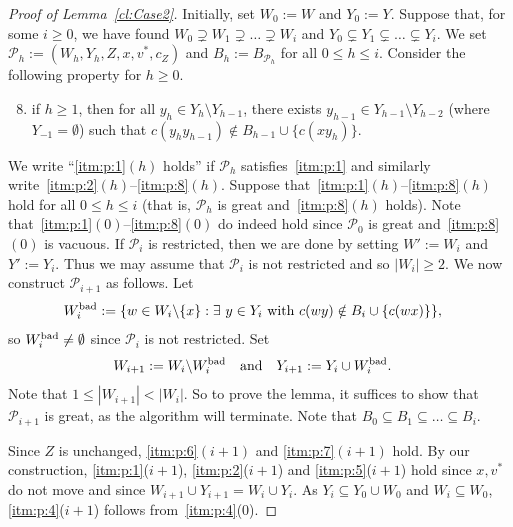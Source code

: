 \documentclass[a4paper, 12pt]{article}
\numberwithin{equation}{section}
\def\sm{{\setminus}}
\newcommand{\mc}[1]{\mathcal{#1}}
\begin{document}
\begin{proof}[Proof of Lemma~\ref{cl:Case2}]
Initially, set $W_0 := W$ and $Y_0 := Y$.
Suppose that, for some $i \ge 0$, we have found
$W_0 \supsetneq W_1 \supsetneq \dots \supsetneq W_i$ and $Y_0 \subsetneq Y_1 \subsetneq \dots \subsetneq Y_i$.
We set $\mc{P}_h := (W_h, Y_h,Z, x, v^*, c_Z)$ and $B_h := B_{\mc{P}_h}$ for all $0 \leq h \leq i$.
Consider the following property for $h \geq 0$.

\medskip
\begin{enumerate}[label = {\rm P${\arabic*}(h)$:}, ref = {\rm P${\arabic*}$}]
\setcounter{enumi}{7}
\item if $h \geq 1$, then for all $y_{h} \in Y_{h} \sm Y_{h-1}$, there exists $y_{h-1} \in Y_{h-1} \sm Y_{h-2}$ (where $Y_{-1}=\emptyset$) such that  $c(y_{h}y_{h-1}) \notin B_{{h-1}}  \cup \{c(x y_{h})\}$.\label{itm:p:8}
\end{enumerate}
\medskip
We write ``\ref{itm:p:1}$(h)$ holds'' if $\mc{P}_h$ satisfies~\ref{itm:p:1} and similarly write~\ref{itm:p:2}$(h)$--\ref{itm:p:8}$(h)$.
Suppose that~\ref{itm:p:1}$(h)$--\ref{itm:p:8}$(h)$ hold for all $0 \leq h \leq i$
(that is, $\mc{P}_h$ is great and~\ref{itm:p:8}$(h)$ holds).
Note that~\ref{itm:p:1}$(0)$--\ref{itm:p:8}$(0)$ do indeed hold since $\mc{P}_0$ is great and~\ref{itm:p:8}$(0)$ is vacuous. 
If $\mc{P}_i$ is restricted, then we are done by setting $W' := W_i$ and $Y' := Y_i$.
Thus we may assume that $\mc{P}_i$ is not restricted and so $|W_i| \ge 2$. 
We now construct $\mc{P}_{i+1}$ as follows. 
Let 
\begin{align*}
W^{\rm bad}_i &:= \{ w \in W_i\sm\{x\} : \exists \ y \in Y_i \text{ with }c(wy) \notin B_i \cup \{c(wx)\}\},
\end{align*}
so $W^{\rm bad}_i \ne \emptyset$ since $\mc{P}_i$ is not restricted.
Set 
\begin{align*}
	W_{i+1} &:= W_i \sm W^{\rm bad}_i
    \quad\text{and}\quad
	Y_{i+1} := Y_i \cup W^{\rm bad}_i.
\end{align*}
Note that $1 \le |W_{i+1}| < |W_i|$.
So to prove the lemma, it suffices to show that $\mc{P}_{i+1}$ is great, as the algorithm will terminate. 
Note that $B_0 \subseteq B_1 \subseteq \dots \subseteq B_i$. 


Since $Z$ is unchanged, \ref{itm:p:6}$(i+1)$ and \ref{itm:p:7}$(i+1)$ hold. 
By our construction, \ref{itm:p:1}($i+1$), \ref{itm:p:2}($i+1$) and \ref{itm:p:5}($i+1$) hold since $x,v^*$ do not move and since $W_{i+1}\cup Y_{i+1}=W_{i}\cup Y_{i}$.
As $Y_i \subseteq Y_0 \cup W_0$ and $W_i \subseteq W_0$, \ref{itm:p:4}($i+1$) follows from~\ref{itm:p:4}($0$).


\end{proof}
\end{document}
